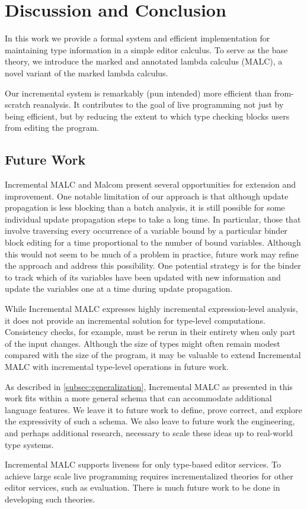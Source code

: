 
\section{Discussion and Conclusion}%
\label{sec:Discussion and Conclusion}
In this work we provide a formal system and efficient implementation for maintaining type information in a simple editor calculus. To serve as the base theory, we introduce the marked and annotated lambda calculus (MALC), a novel variant of the marked lambda calculus. 

Our incremental system is remarkably (pun intended) more efficient than from-scratch reanalysis. It contributes to the goal of live programming not just by being efficient, but by reducing the extent to which type checking blocks users from editing the program. 


\subsection{Future Work}
Incremental MALC and Malcom present several opportunities for extension and improvement. One notable limitation of our approach is that although update propagation is less blocking than a batch analysis, it is still possible for some individual update propagation steps to take a long time. In particular, those that involve traversing every occurrence of a variable bound by a particular binder block editing for a time proportional to the number of bound variables. Although this would not seem to be much of a problem in practice, future work may refine the approach and address this possibility. One potential strategy is for the binder to track which of its variables have been updated with new information and update the variables one at a time during update propagation.

While Incremental MALC expresses highly incremental expression-level analysis, it does not provide an incremental solution for type-level computations. Consistency checks, for example, must be rerun in their entirety when only part of the input changes. Although the size of types might often remain modest compared with the size of the program, it may be valuable to extend Incremental MALC with incremental type-level operations in future work. 

As described in \autoref{subsec:generalization}, Incremental MALC as presented in this work fits within a more general schema that can accommodate additional language features. We leave it to future work to define, prove correct, and explore the expressivity of such a schema. We also leave to future work the engineering, and perhaps additional research, necessary to scale these ideas up to real-world type systems. 

Incremental MALC supports liveness for only type-based editor services. To achieve large scale live programming requires incrementalized theories for other editor services, such as evaluation. There is much future work to be done in developing such theories. 
